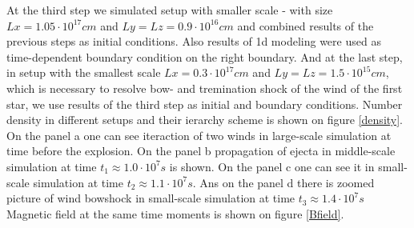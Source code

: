 \documentclass[a4paper,12pt]{extreport}
\begin{document}
At the third step we simulated setup with smaller scale - with size $Lx = 1.05\cdot 10^{17} cm$ and $Ly = Lz = 0.9\cdot 10^{16} cm$ and combined results of the previous steps as initial conditions. Also results of 1d modeling were used as time-dependent boundary condition on the right boundary. And at the last step, in setup with the smallest scale $Lx = 0.3\cdot 10^{17} cm$ and $Ly = Lz = 1.5\cdot 10^{15} cm$, which is necessary to resolve bow- and tremination shock of the wind of the first star, we use results of the third step as initial and boundary conditions. Number density in different setups and their ierarchy scheme is shown on figure \ref{density}. On the panel a one can see iteraction of two winds in large-scale simulation at time before the explosion. On the panel b propagation of ejecta in middle-scale simulation at time $t_1 \approx 1.0\cdot10^7 s$ is shown. On the panel c one can see it in small-scale simulation at time $t_2 \approx 1.1\cdot10^7 s$. Ans on the panel d there is zoomed picture of wind bowshock in small-scale simulation at time $t_3 \approx 1.4\cdot10^7 s$ Magnetic field at the same time moments is shown on figure \ref{Bfield}.
\end{document}
